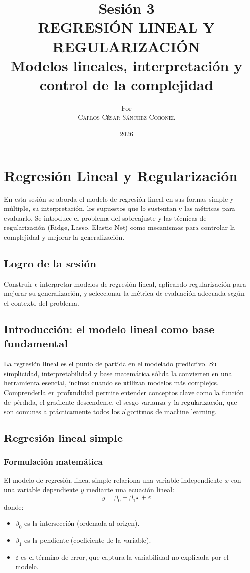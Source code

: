 \documentclass[12pt,a4paper,openany,oneside]{book}
\title{
    \textbf{Sesión 3} \\ 
    \Huge \textbf{REGRESIÓN LINEAL Y REGULARIZACIÓN} \\
    \Large Modelos lineales, interpretación y control de la complejidad
}
\author{
    \small Por \\ \vspace{0.2cm}
    \Large \textsc{Carlos César Sánchez Coronel}
}
\date{2026}
\begin{document}
\maketitle
\tableofcontents
{}

\chapter{Regresión Lineal y Regularización}

En esta sesión se aborda el modelo de regresión lineal en sus formas simple y múltiple, su interpretación, los supuestos que lo sustentan y las métricas para evaluarlo. Se introduce el problema del sobreajuste y las técnicas de regularización (Ridge, Lasso, Elastic Net) como mecanismos para controlar la complejidad y mejorar la generalización.

\section{Logro de la sesión}
Construir e interpretar modelos de regresión lineal, aplicando regularización para mejorar su generalización, y seleccionar la métrica de evaluación adecuada según el contexto del problema.

\section{Introducción: el modelo lineal como base fundamental}
La regresión lineal es el punto de partida en el modelado predictivo. Su simplicidad, interpretabilidad y base matemática sólida la convierten en una herramienta esencial, incluso cuando se utilizan modelos más complejos. Comprenderla en profundidad permite entender conceptos clave como la función de pérdida, el gradiente descendente, el sesgo-varianza y la regularización, que son comunes a prácticamente todos los algoritmos de machine learning.

\section{Regresión lineal simple}

\subsection{Formulación matemática}
El modelo de regresión lineal simple relaciona una variable independiente \(x\) con una variable dependiente \(y\) mediante una ecuación lineal:
\[
y = \beta_0 + \beta_1 x + \varepsilon
\]
donde:
\begin{itemize}
    \item \(\beta_0\) es la intersección (ordenada al origen).
    \item \(\beta_1\) es la pendiente (coeficiente de la variable).
    \item \(\varepsilon\) es el término de error, que captura la variabilidad no explicada por el modelo.
\end{itemize}
\end{document}
